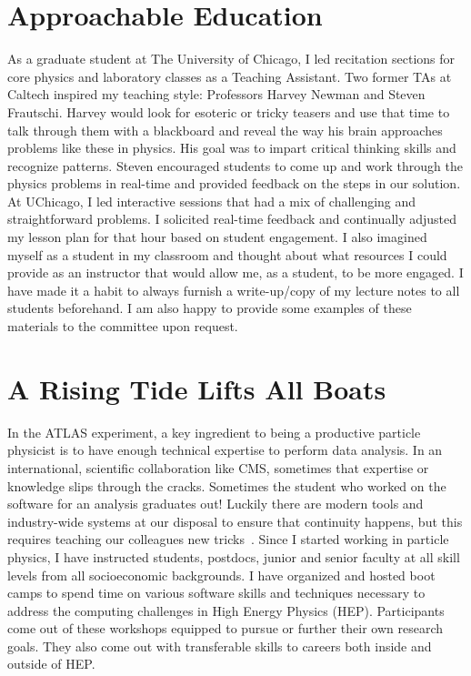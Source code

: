 \documentclass[10pt,a4paper,sans]{moderncv} %
\begin{document}
\section{Approachable Education}
As a graduate student at The University of Chicago, I led recitation sections for core physics and laboratory classes as a Teaching Assistant. Two former TAs at Caltech inspired my teaching style: Professors Harvey Newman and Steven Frautschi. Harvey would look for esoteric or tricky teasers and use that time to talk through them with a blackboard and reveal the way his brain approaches problems like these in physics. His goal was to impart critical thinking skills and recognize patterns. Steven encouraged students to come up and work through the physics problems in real-time and provided feedback on the steps in our solution. At UChicago, I led interactive sessions that had a mix of challenging and straightforward problems. I solicited real-time feedback and continually adjusted my lesson plan for that hour based on student engagement. I also imagined myself as a student in my classroom and thought about what resources I could provide as an instructor that would allow me, as a student, to be more engaged. I have made it a habit to always furnish a write-up/copy of my lecture notes to all students beforehand. I am also happy to provide some examples of these materials to the committee upon request.

\section{A Rising Tide Lifts All Boats}
In the ATLAS experiment, a key ingredient to being a productive particle physicist is to have enough technical expertise to perform data analysis. In an international, scientific collaboration like CMS, sometimes that expertise or knowledge slips through the cracks. Sometimes the student who worked on the software for an analysis graduates out! Luckily there are modern tools and industry-wide systems at our disposal to ensure that continuity happens, but this requires teaching our colleagues new tricks~\cite{Malik2021, irishep2020, gitlabStory2018}. Since I started working in particle physics, I have instructed students, postdocs, junior and senior faculty at all skill levels from all socioeconomic backgrounds. I have organized and hosted boot camps to spend time on various software skills and techniques necessary to address the computing challenges in High Energy Physics (HEP). Participants come out of these workshops equipped to pursue or further their own research goals. They also come out with transferable skills to careers both inside and outside of HEP.
\end{document}
